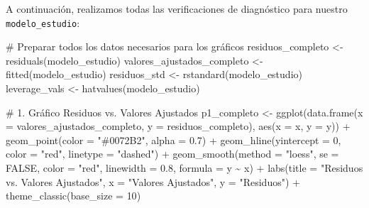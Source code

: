 \documentclass[
  letterpaper,
  DIV=11,
  numbers=noendperiod]{scrreprt}
\newenvironment{Shaded}{\begin{snugshade}}{\end{snugshade}}
\newcommand{\AttributeTok}[1]{\textcolor[rgb]{0.40,0.45,0.13}{#1}}
\newcommand{\CommentTok}[1]{\textcolor[rgb]{0.37,0.37,0.37}{#1}}
\newcommand{\ConstantTok}[1]{\textcolor[rgb]{0.56,0.35,0.01}{#1}}
\newcommand{\DecValTok}[1]{\textcolor[rgb]{0.68,0.00,0.00}{#1}}
\newcommand{\FloatTok}[1]{\textcolor[rgb]{0.68,0.00,0.00}{#1}}
\newcommand{\FunctionTok}[1]{\textcolor[rgb]{0.28,0.35,0.67}{#1}}
\newcommand{\NormalTok}[1]{\textcolor[rgb]{0.00,0.23,0.31}{#1}}
\newcommand{\OtherTok}[1]{\textcolor[rgb]{0.00,0.23,0.31}{#1}}
\newcommand{\SpecialCharTok}[1]{\textcolor[rgb]{0.37,0.37,0.37}{#1}}
\newcommand{\StringTok}[1]{\textcolor[rgb]{0.13,0.47,0.30}{#1}}
\begin{document}
\begin{tcolorbox}[enhanced jigsaw, breakable, toprule=.15mm, bottomtitle=1mm, coltitle=black, colbacktitle=quarto-callout-tip-color!10!white, titlerule=0mm, opacitybacktitle=0.6, bottomrule=.15mm, toptitle=1mm, title=\textcolor{quarto-callout-tip-color}{\faLightbulb}\hspace{0.5em}{Diagnóstico completo del modelo de estudio}, arc=.35mm, rightrule=.15mm, opacityback=0, colframe=quarto-callout-tip-color-frame, leftrule=.75mm, left=2mm, colback=white]

A continuación, realizamos todas las verificaciones de diagnóstico para
nuestro \texttt{modelo\_estudio}:

\begin{Shaded}
\begin{Highlighting}[]
\CommentTok{\# Preparar todos los datos necesarios para los gráficos}
\NormalTok{residuos\_completo }\OtherTok{\textless{}{-}} \FunctionTok{residuals}\NormalTok{(modelo\_estudio)}
\NormalTok{valores\_ajustados\_completo }\OtherTok{\textless{}{-}} \FunctionTok{fitted}\NormalTok{(modelo\_estudio)}
\NormalTok{residuos\_std }\OtherTok{\textless{}{-}} \FunctionTok{rstandard}\NormalTok{(modelo\_estudio)}
\NormalTok{leverage\_vals }\OtherTok{\textless{}{-}} \FunctionTok{hatvalues}\NormalTok{(modelo\_estudio)}

\CommentTok{\# 1. Gráfico Residuos vs. Valores Ajustados}
\NormalTok{p1\_completo }\OtherTok{\textless{}{-}} \FunctionTok{ggplot}\NormalTok{(}\FunctionTok{data.frame}\NormalTok{(}\AttributeTok{x =}\NormalTok{ valores\_ajustados\_completo, }\AttributeTok{y =}\NormalTok{ residuos\_completo), }
                      \FunctionTok{aes}\NormalTok{(}\AttributeTok{x =}\NormalTok{ x, }\AttributeTok{y =}\NormalTok{ y)) }\SpecialCharTok{+}
  \FunctionTok{geom\_point}\NormalTok{(}\AttributeTok{color =} \StringTok{"\#0072B2"}\NormalTok{, }\AttributeTok{alpha =} \FloatTok{0.7}\NormalTok{) }\SpecialCharTok{+}
  \FunctionTok{geom\_hline}\NormalTok{(}\AttributeTok{yintercept =} \DecValTok{0}\NormalTok{, }\AttributeTok{color =} \StringTok{"red"}\NormalTok{, }\AttributeTok{linetype =} \StringTok{"dashed"}\NormalTok{) }\SpecialCharTok{+}
  \FunctionTok{geom\_smooth}\NormalTok{(}\AttributeTok{method =} \StringTok{"loess"}\NormalTok{, }\AttributeTok{se =} \ConstantTok{FALSE}\NormalTok{, }\AttributeTok{color =} \StringTok{"red"}\NormalTok{, }\AttributeTok{linewidth =} \FloatTok{0.8}\NormalTok{, }\AttributeTok{formula =}\NormalTok{ y }\SpecialCharTok{\textasciitilde{}}\NormalTok{ x) }\SpecialCharTok{+}
  \FunctionTok{labs}\NormalTok{(}\AttributeTok{title =} \StringTok{"Residuos vs. Valores Ajustados"}\NormalTok{, }\AttributeTok{x =} \StringTok{"Valores Ajustados"}\NormalTok{, }\AttributeTok{y =} \StringTok{"Residuos"}\NormalTok{) }\SpecialCharTok{+}
  \FunctionTok{theme\_classic}\NormalTok{(}\AttributeTok{base\_size =} \DecValTok{10}\NormalTok{)}


\end{Highlighting}
\end{Shaded}
\end{tcolorbox}
\end{document}
